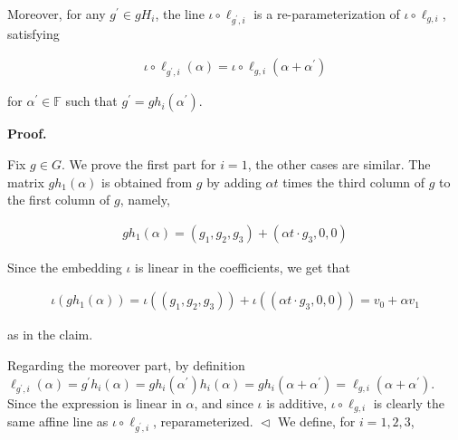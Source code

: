 \documentclass[10pt,a4paper]{article}
\begin{document}
Moreover, for any $g^{\prime}\in gH_{i}$, the line $\iota\circ\ell_{g^{\prime},i}$ is a re-parameterization of $\iota\circ\ell_{g,i}$, satisfying\par


\[\begin{gathered}
\iota\circ\ell_{g^{\prime},i}(\alpha)=\iota\circ\ell_{g,i}(\alpha+\alpha^{\prime})
\end{gathered}\]


for $\alpha^{\prime}\in\mathbb{F}$ such that $g^{\prime}=gh_{i}(\alpha^{\prime})$.\par






\par\medskip\noindent\textbf{
\textbf{Proof}.}\par




Fix $g\in G$. We prove the first part for $i=1$, the other cases are similar. The matrix $gh_{1}(\alpha)$ is obtained from $g$ by adding $\alpha t$ times the third column of $g$ to the first column of $g$, namely,\par


\[\begin{gathered}
gh_{1}(\alpha)=(g_{1},g_{2},g_{3})+(\alpha t\cdot g_{3},0,0)
\end{gathered}\]


Since the embedding $\iota$ is linear in the coefficients, we get that\par


\[\begin{gathered}
\iota(gh_{1}(\alpha))=\iota((g_{1},g_{2},g_{3}))+\iota((\alpha t\cdot g_{3},0,0))=v_{0}+\alpha v_{1}
\end{gathered}\]


as in the claim.\par




Regarding the moreover part, by definition $\ell_{g^{\prime},i}(\alpha)=g^{\prime}h_{i}(\alpha)=gh_{i}(\alpha^{\prime})h_{i}(\alpha)=gh_{i}(\alpha+\alpha^{\prime})=\ell_{g,i}(\alpha+\alpha^{\prime})$. Since the expression is linear in $\alpha$, and since $\iota$ is additive, $\iota\circ\ell_{g,i}$ is clearly the same affine line as $\iota\circ\ell_{g^{\prime},i}$, reparameterized.
$\vartriangleleft$
We define, for $i=1,2,3$,\par
\end{document}
